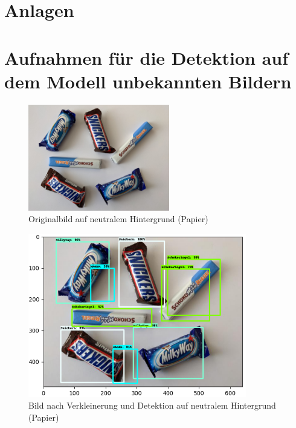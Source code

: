     \section*{Anlagen}\label{Anhang}
    
    \appendix
    \section{Aufnahmen für die Detektion auf dem Modell unbekannten Bildern}
    \label{app: Aufnahmen für die Detektion auf dem Modell unbekannten Bildern}
    
    \begin{figure}[htbp]
        \centering
        \includegraphics[width = 0.55\textwidth]{Bilder/misc/on_paper.jpg}
        \caption{Originalbild auf neutralem Hintergrund (Papier)}
        \label{fig:on_paper}
    \end{figure}
    
    \begin{figure}[htbp]
        \vspace{-1cm}
        \centering
        \includegraphics[width = 0.85\textwidth]{Bilder/misc/detection_on_paper.png}
        \caption{Bild nach Verkleinerung und Detektion auf neutralem Hintergrund (Papier)}
        \label{fig:det_on_paper}
    \end{figure}
    
